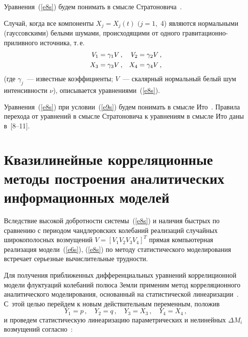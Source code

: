 \begin{multicols}{2}
Уравнения~(\ref{e8s}) будем понимать в смысле Стратоновича~\cite{23s}.

Случай, когда все компоненты $X_j = X_j(t)$ $(j=1$,~4) являются
нормальными (гауссовскими) белыми шумами, происходящими от одного
гравитационно-приливного источника, т.\,е.\
\begin{align}
V_1&=\gamma_1 V\,,& V_2&=\gamma_2 V\,,\notag\\
X_3&=\gamma_3 V\,,& X_4&=\gamma_4 V\,,\label{e9s}
\end{align}
(где $\gamma_j$~--- известные коэффициенты; $V$~--- скалярный
нормальный белый шум интенсивности $\nu$), описывается уравнениями~(\ref{e8s}).

Уравнения~(\ref{e8s}) при условии~(\ref{e9s}) будем понимать в смысле Ито~\cite{23s}.
Правила перехода от уравнений в смысле Стратоновича к уравнениям в
смысле Ито даны в~[8--11]. %


\section{Квазилинейные корреляционные методы построения аналитических
информационных моделей} %

Вследствие высокой добротности системы~(\ref{e8s}) и наличия быстрых по
сравнению с периодом чандлеровских колебаний реализаций случайных
широкополосных возмущений $V=\left[ V_1 V_2 V_3 V_4\right]^T$ прямая
компьютерная реализация модели~(\ref{e6s}), (\ref{e8s}) по методу статистического
моделирования~\cite{23s} встречает серьезные вычислительные трудности. 

Для %
получения приближенных дифференциальных уравнений коррелиционной
модели флуктуаций колебаний полюса Земли применим метод
корреляционного аналитического моделирования, основанный на
статистической линеаризации~\cite{23s}. С~этой целью перейдем к новым
действительным переменным, положив 
$$Y_1=p\,,\quad Y_2 =q\,,\quad Y_3 = X_3\,,\quad Y_4 = X_4\,,$$ 
и проведем статистическую линеаризацию параметрических и
нелинейных $\Delta M_i$ возмущений согласно~\cite{23s}:


\end{multicols}
